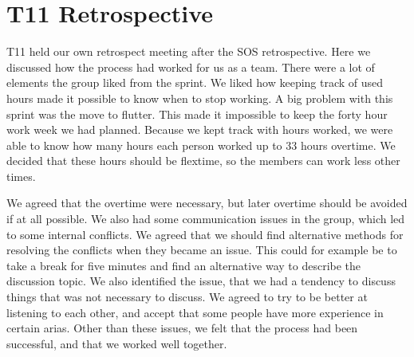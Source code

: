 \section{T11 Retrospective} \label{s1Retrospective}
\gls{T11} held our own retrospect meeting after the SOS retrospective. 
Here we discussed how the process had worked for us as a team. 
There were a lot of elements the group liked from the sprint. 
We liked how keeping track of used hours made it possible to know when to stop working. 
A big problem with this sprint was the move to flutter. This made it impossible to keep the forty hour work week we had planned. 
Because we kept track with hours worked, we were able to know how many hours each person worked up to 33 hours overtime. We decided that these hours should be flextime, so the members can work less other times. 

We agreed that the overtime were necessary, but later overtime should be avoided if at all possible.
We also had some communication issues in the group, which led to some internal conflicts. We agreed that we should find alternative methods for resolving the conflicts when they became an issue. This could for example be to take a break for five minutes and find an alternative way to describe the discussion topic. 
We also identified the issue, that we had a tendency to discuss things that was not necessary to discuss. We agreed to try to be better at listening to each other, and accept that some people have more experience in certain arias. 
Other than these issues, we felt that the process had been successful, and that we worked well together.